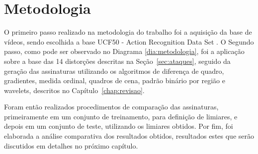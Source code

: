 
\chapter{Metodologia}
\label{chap:metodologia}


O primeiro passo realizado na metodologia do trabalho foi a aquisição da base de vídeos, sendo escolhida a base UCF50 - Action Recognition Data Set \citeauthor{reddy2013recognizing}. O Segundo passo, como pode ser observado no Diagrama \ref{dia:metodologia}, foi a aplicação sobre a base das 14 distorções descritas na Seção~\ref{sec:ataques}, seguido da geração das assinaturas utilizando os algoritmos de diferença de quadro, gradientes, medida ordinal, quadros de cena, padrão binário por região e wavelets, descritos no Capítulo~\ref{chap:revisao}. 

Foram então realizados procedimentos de comparação das assinaturas, primeiramente em um conjunto de treinamento, para definição de limiares, e depois em um conjunto de teste, utilizando os limiares obtidos. Por fim, foi elaborada a análise comparativa dos resultados obtidos, resultados estes que serão discutidos em detalhes no próximo capítulo.


